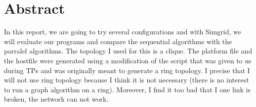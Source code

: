 \documentclass[
10pt, %
a4paper, %
oneside, %
headinclude,footinclude, %
BCOR5mm, %
]{scrartcl}
\title{\normalfont\spacedallcaps{Article Title}} %
\author{\spacedlowsmallcaps{Vincent Rébiscoul}} %
\date{} %
\begin{document}

\renewcommand{\sectionmark}[1]{\markright{\spacedlowsmallcaps{#1}}} %
\lehead{\mbox{\llap{\small\thepage\kern1em\color{halfgray} \vline}\color{halfgray}\hspace{0.5em}\rightmark\hfil}} %

\pagestyle{scrheadings} %


\maketitle %

\setcounter{tocdepth}{2} %

\tableofcontents %

\listoffigures %

\listoftables %


\section*{Abstract} %

In this report, we are going to try several configurations and with
Simgrid, we will evaluate our programs and compare the sequential
algorithms with the parralel algorithms. The topology I used for this
is a clique. The platform file and the hostfile were generated using a
modification of the script that was given to us during TPs and was
originally meant to generate a ring topology. I precise that I will
not use ring topology because I think it is not necessary (there is no
interest to run a graph algorithm on a ring). Moreover, I find it too
bad that I one link is broken, the network can not work.
\end{document}
